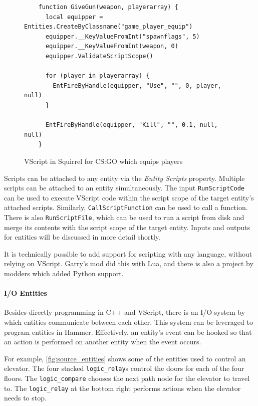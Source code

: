 \documentclass[a4paper, 12pt]{scrartcl}
\begin{document}
\begin{figure}[!htp]
  \begin{verbatim}
    function GiveGun(weapon, playerarray) {
      local equipper = Entities.CreateByClassname("game_player_equip")
      equipper.__KeyValueFromInt("spawnflags", 5)
      equipper.__KeyValueFromInt(weapon, 0)
      equipper.ValidateScriptScope()

      for (player in playerarray) {
        EntFireByHandle(equipper, "Use", "", 0, player, null)
      }

      EntFireByHandle(equipper, "Kill", "", 0.1, null, null)
    }
  \end{verbatim}
  \caption{VScript in Squirrel for CS:GO which equips players}
  \label{fig:source_vscript}
\end{figure}

Scripts can be attached to any entity via the \textit{Entity Scripts} property. Multiple scripts can be attached to an entity simultaneously. The input \texttt{RunScriptCode} can be used to execute VScript code within the script scope of the target entity's attached scripts. Similarly, \texttt{CallScriptFunction} can be used to call a function. There is also \texttt{RunScriptFile}, which can be used to run a script from disk and merge its contents with the script scope of the target entity. Inputs and outputs for entities will be discussed in more detail shortly.

It is technically possible to add support for scripting with any language, without relying on VScript. Garry's mod did this with Lua, and there is also a project by modders which added Python support.

\paragraph{I/O Entities}
Besides directly programming in C++ and VScript, there is an I/O system by which entities communicate between each other. This system can be leveraged to program entities in Hammer. Effectively, an entity's event can be hooked so that an action is performed on another entity when the event occurs.

For example, \cref{fig:source_entities} shows some of the entities used to control an elevator. The four stacked \texttt{logic\_relay}s control the doors for each of the four floors. The \texttt{logic\_compare} chooses the next path node for the elevator to travel to. The \texttt{logic\_relay} at the bottom right performs actions when the elevator needs to stop.
\end{document}
